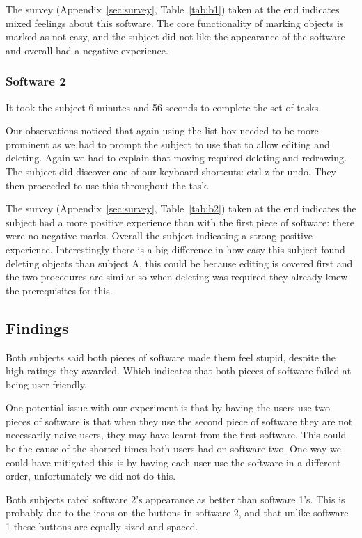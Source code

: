 \documentclass[a4paper,11pt,oneside]{article}
\begin{document}
The survey (Appendix~\ref{sec:survey}, Table~\ref{tab:b1}) taken at the end indicates mixed feelings about this software.  The core functionality of marking objects is marked as not easy, and the subject did not like the appearance of the software and overall had a negative experience.


\subsubsection{Software 2}
It took the subject 6 minutes and 56 seconds to complete the set of tasks.

Our observations noticed that again using the list box needed to be more prominent as we had to prompt the subject to use that to allow editing and deleting.  Again we had to explain that moving required deleting and redrawing.  The subject did discover one of our keyboard shortcuts: ctrl-z for undo.  They then proceeded to use this throughout the task.

The survey (Appendix~\ref{sec:survey}, Table~\ref{tab:b2}) taken at the end indicates the subject had a more positive experience than with the first piece of software: there were no negative marks.  Overall the subject indicating a strong positive experience.  Interestingly there is a big difference in how easy this subject found deleting objects than subject A, this could be because editing is covered first and the two procedures are similar so when deleting was required they already knew the prerequisites for this.

\subsection{Findings}
Both subjects said both pieces of software made them feel stupid, despite the high ratings they awarded.  Which indicates that both pieces of software failed at being user friendly.

One potential issue with our experiment is that by having the users use two pieces of software is that when they use the second piece of software they are not necessarily naive users, they may have learnt from the first software.  This could be the cause of the shorted times both users had on software two.  One way we could have mitigated this is by having each user use the software in a different order, unfortunately we did not do this.

Both subjects rated software 2's appearance as better than software 1's.  This is probably due to the icons on the buttons in software 2, and that unlike software 1 these buttons are equally sized and spaced.
\end{document}
